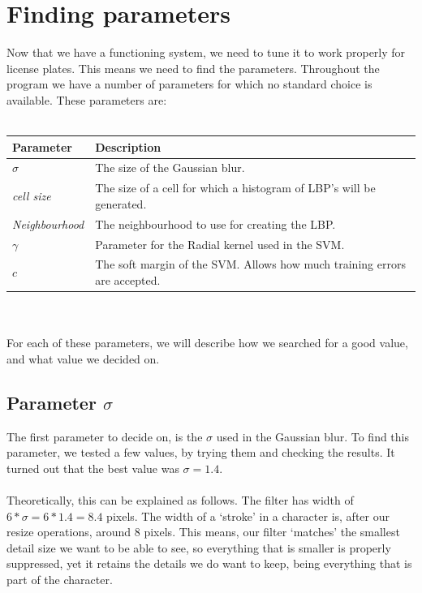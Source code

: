 \documentclass[a4paper]{article}
\begin{document}
\section{Finding parameters}

Now that we have a functioning system, we need to tune it to work properly for
license plates. This means we need to find the parameters. Throughout the 
program we have a number of parameters for which no standard choice is
available. These parameters are:\\
\\
\begin{tabular}{l|l}
	Parameter 			& Description\\
	\hline
	$\sigma$  			& The size of the Gaussian blur.\\
	\emph{cell size}	& The size of a cell for which a histogram of LBP's
	                      will be generated.\\
	\emph{Neighbourhood}& The neighbourhood to use for creating the LBP.\\
	$\gamma$			& Parameter for the Radial kernel used in the SVM.\\
	$c$					& The soft margin of the SVM. Allows how much training
						  errors are accepted.\\
\end{tabular}\\
\\
For each of these parameters, we will describe how we searched for a good
value, and what value we decided on.

\subsection{Parameter $\sigma$}

The first parameter to decide on, is the $\sigma$ used in the Gaussian blur. To
find this parameter, we tested a few values, by trying them and checking the
results. It turned out that the best value was $\sigma = 1.4$.\\
\\
Theoretically, this can be explained as follows. The filter has width of 
$6 * \sigma = 6 * 1.4 = 8.4$ pixels. The width of a `stroke' in a character is,
after our resize operations, around 8 pixels. This means, our filter `matches'
the smallest detail size we want to be able to see, so everything that is
smaller is properly suppressed, yet it retains the details we do want to keep,
being everything that is part of the character.
\end{document}
